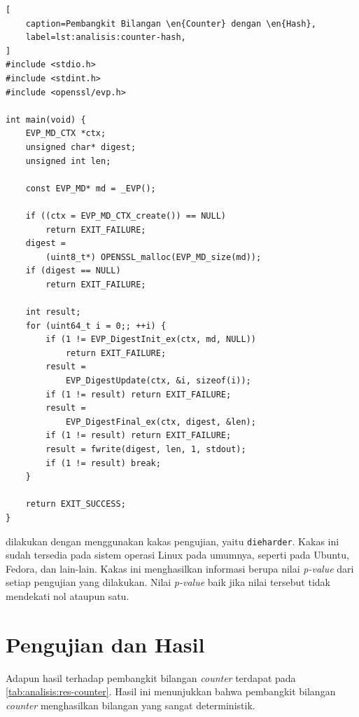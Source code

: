 \documentclass[conference]{IEEEtran}
\newcommand{\en}[1]
    {\foreignlanguage{english}{\textit{#1}}}
\begin{document}
\begin{lstlisting}[
    caption=Pembangkit Bilangan \en{Counter} dengan \en{Hash},
    label=lst:analisis:counter-hash,
]
#include <stdio.h>
#include <stdint.h>
#include <openssl/evp.h>

int main(void) {
    EVP_MD_CTX *ctx;
    unsigned char* digest;
    unsigned int len;

    const EVP_MD* md = _EVP();

    if ((ctx = EVP_MD_CTX_create()) == NULL)
        return EXIT_FAILURE;
    digest =
        (uint8_t*) OPENSSL_malloc(EVP_MD_size(md));
    if (digest == NULL)
        return EXIT_FAILURE;

    int result;
    for (uint64_t i = 0;; ++i) {
        if (1 != EVP_DigestInit_ex(ctx, md, NULL))
            return EXIT_FAILURE;
        result =
            EVP_DigestUpdate(ctx, &i, sizeof(i));
        if (1 != result) return EXIT_FAILURE;
        result =
            EVP_DigestFinal_ex(ctx, digest, &len);
        if (1 != result) return EXIT_FAILURE;
        result = fwrite(digest, len, 1, stdout);
        if (1 != result) break;
    }

    return EXIT_SUCCESS;
}
\end{lstlisting}

 dilakukan dengan menggunakan kakas pengujian, yaitu \texttt{dieharder}.
Kakas ini sudah tersedia pada sistem operasi Linux pada umumnya, seperti pada Ubuntu, Fedora, dan lain-lain.
Kakas ini menghasilkan informasi berupa nilai \en{p-value} dari setiap pengujian yang dilakukan.
Nilai \en{p-value} baik jika nilai tersebut tidak mendekati nol ataupun satu.

\section{Pengujian dan Hasil}

Adapun hasil  terhadap pembangkit bilangan \en{counter} terdapat pada \autoref{tab:analisis:res-counter}.
Hasil ini menunjukkan bahwa pembangkit bilangan \en{counter} menghasilkan bilangan yang sangat deterministik.
\end{document}
